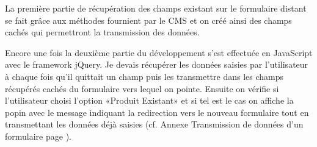 \documentclass[a4paper,11pt,twoside]{report}
\begin{document}
      La première partie de récupération des champs existant sur le formulaire distant se fait grâce aux méthodes fournient par le CMS et on créé ainsi des champs cachés qui permettront la transmission des données. 
      \label{question_conditionnelle_1}
      
      Encore une fois la deuxième partie du développement s'est effectuée en JavaScript avec le framework jQuery. Je devais récupérer les données saisies par l'utilisateur à chaque fois qu'il quittait un champ puis les transmettre dans les champs récupérés cachés du formulaire vers lequel on pointe. Ensuite on vérifie si l'utilisateur choisi l'option «Produit Existant» et si tel est le cas on affiche la popin avec le message indiquant la redirection vers le nouveau formulaire tout en transmettant les données déjà saisies (cf. Annexe Transmission de données d'un formulaire page \pageref{transmission_de_donnees_d_un_formulaire}).
\end{document}
